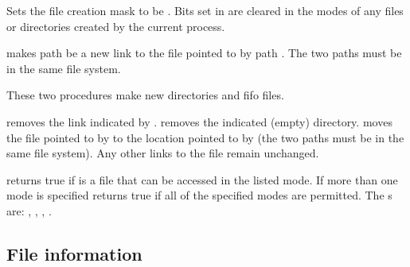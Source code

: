 \begin{protos}
\end{protos}
\noindent
Sets the file creation mask to be .
Bits set in  are cleared in the modes of any files or
 directories created by the current process.

\begin{protos}
\end{protos}
\noindent
{} makes path  be a new link to the file
 pointed to by path .
The two paths must be in the same file system.


\begin{protos}
\end{protos}
\noindent
These two procedures make new directories and fifo files.


\begin{protos}
\end{protos}
\noindent
{} removes the link indicated by .
 removes the indicated (empty) directory.
 moves the file pointed to by  to the
 location pointed to by  (the two paths must be in
 the same file system).
Any other links to the file remain unchanged.


\begin{protos}
\end{protos}
\noindent
{} returns true if  is a file that
 can be accessed in the listed mode.
If more than one mode is specified  returns true
 if all of the specified modes are permitted.
The \/s are: , , ,
 .

\subsection{File information}

